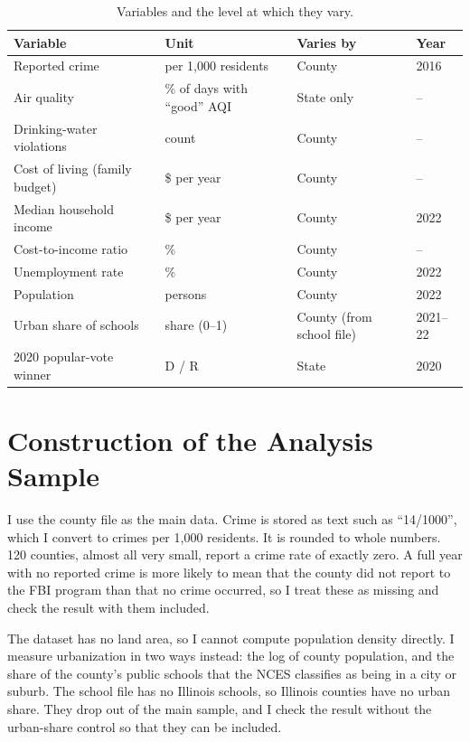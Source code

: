 \documentclass[12pt,letterpaper]{report}
\begin{document}
\begin{table}[H]
\centering
\caption{Variables and the level at which they vary.}
\label{tab:levels}
\small
\begin{tabular}{@{}llll@{}}
\toprule
Variable & Unit & Varies by & Year \\
\midrule
Reported crime & per 1,000 residents & County & 2016 \\
Air quality & \% of days with ``good'' AQI & State only & -- \\
Drinking-water violations & count & County & -- \\
Cost of living (family budget) & \$ per year & County & -- \\
Median household income & \$ per year & County & 2022 \\
Cost-to-income ratio & \% & County & -- \\
Unemployment rate & \% & County & 2022 \\
Population & persons & County & 2022 \\
Urban share of schools & share (0--1) & County (from school file) & 2021--22 \\
2020 popular-vote winner & D / R & State & 2020 \\
\bottomrule
\end{tabular}
\end{table}

\section{Construction of the Analysis Sample}
I use the county file as the main data. Crime is stored as text such as ``14/1000'', which I
convert to crimes per 1,000 residents. It is rounded to whole numbers. 120 counties, almost
all very small, report a crime rate of exactly zero. A full year with no reported crime is
more likely to mean that the county did not report to the FBI program than that no crime
occurred, so I treat these as missing and check the result with them included.

The dataset has no land area, so I cannot compute population density directly. I measure
urbanization in two ways instead: the log of county population, and the share of the
county's public schools that the NCES classifies as being in a city or suburb. The school
file has no Illinois schools, so Illinois counties have no urban share. They drop out of
the main sample, and I check the result without the urban-share control so that they can
be included.
\end{document}
